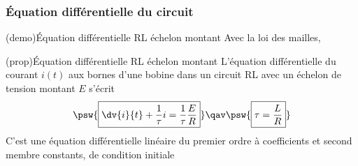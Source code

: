 \documentclass[../../main/main.tex]{subfiles}
\begin{document}
\subsubsection{Équation différentielle du circuit}
\begin{tcb}[label=demo:eqdiffrl,
  list entry={\lte\thedemo~:~Équa. diff. RL montant}]
  (demo){Équation différentielle RL échelon montant}
	Avec la loi des mailles,
  \vspace{-25pt}
	\vspace{-15pt}
\end{tcb}
\begin{tcb*}[label=prop:eqdifflc, sidebyside, righthand ratio=.4,
  list entry={\lte\theprop~:~Équa. diff. RL montant}]
  (prop){Équation différentielle RL échelon montant}
	L'équation différentielle du courant $i(t)$ aux bornes d'une bobine
	dans un circuit RL avec un échelon de tension montant $E$ s'écrit
		\[
	\psw{%
			\boxed{\dv{i}{t} + \frac{1}{\tau}i = \frac{1}{\tau}\frac{E}{R}}
	}%
  \qav
  \psw{%
    \boxed{\tau = \frac{L}{R}}
  }%
		\]
	\tcblower
	C'est une équation différentielle linéaire du premier ordre à
	coefficients et second membre constants, de condition initiale
	\psw{%
		\[
			\boxed{i(0^-) = i(0^+) = 0}
		\]
	}%
\end{tcb*}

\end{document}

